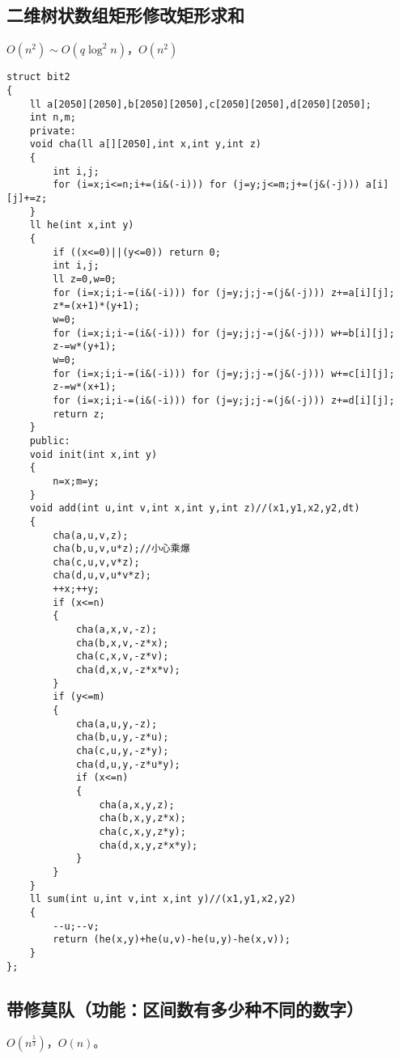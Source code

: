 \documentclass[12pt]{ctexart}
\begin{document}
\subsection{二维树状数组矩形修改矩形求和}

$O(n^2)\sim O(q\log^2n)$，$O(n^2)$

\begin{lstlisting}
struct bit2
{
	ll a[2050][2050],b[2050][2050],c[2050][2050],d[2050][2050];
	int n,m;
	private:
	void cha(ll a[][2050],int x,int y,int z)
	{
		int i,j;
		for (i=x;i<=n;i+=(i&(-i))) for (j=y;j<=m;j+=(j&(-j))) a[i][j]+=z;
	}
	ll he(int x,int y)
	{
		if ((x<=0)||(y<=0)) return 0;
		int i,j;
		ll z=0,w=0;
		for (i=x;i;i-=(i&(-i))) for (j=y;j;j-=(j&(-j))) z+=a[i][j];
		z*=(x+1)*(y+1);
		w=0;
		for (i=x;i;i-=(i&(-i))) for (j=y;j;j-=(j&(-j))) w+=b[i][j];
		z-=w*(y+1);
		w=0;
		for (i=x;i;i-=(i&(-i))) for (j=y;j;j-=(j&(-j))) w+=c[i][j];
		z-=w*(x+1);
		for (i=x;i;i-=(i&(-i))) for (j=y;j;j-=(j&(-j))) z+=d[i][j];
		return z;
	}
	public:
	void init(int x,int y)
	{
		n=x;m=y;
	}
	void add(int u,int v,int x,int y,int z)//(x1,y1,x2,y2,dt)
	{
		cha(a,u,v,z);
		cha(b,u,v,u*z);//小心乘爆
		cha(c,u,v,v*z);
		cha(d,u,v,u*v*z);
		++x;++y;
		if (x<=n)
		{
			cha(a,x,v,-z);
			cha(b,x,v,-z*x);
			cha(c,x,v,-z*v);
			cha(d,x,v,-z*x*v);
		}
		if (y<=m)
		{
			cha(a,u,y,-z);
			cha(b,u,y,-z*u);
			cha(c,u,y,-z*y);
			cha(d,u,y,-z*u*y);
			if (x<=n)
			{
				cha(a,x,y,z);
				cha(b,x,y,z*x);
				cha(c,x,y,z*y);
				cha(d,x,y,z*x*y);
			}
		}
	}
	ll sum(int u,int v,int x,int y)//(x1,y1,x2,y2)
	{
		--u;--v;
		return (he(x,y)+he(u,v)-he(u,y)-he(x,v));
	}
};
\end{lstlisting}

\subsection{带修莫队（功能：区间数有多少种不同的数字）}

$O(n^{\frac {5}{3}})$，$O(n)$。
\end{document}
